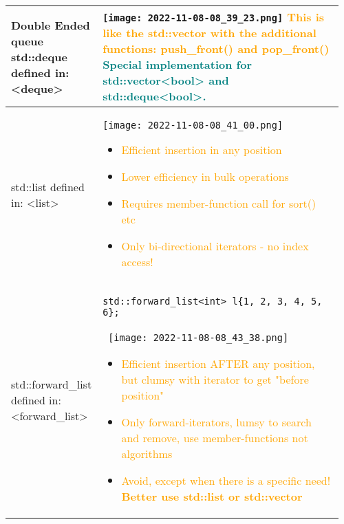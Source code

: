 \documentclass[main.tex,fontsize=8pt,paper=a4,paper=portrait,DIV=calc,]{scrartcl}
\begin{document}
\pagebreak
\begin{table}[ht!]
\begin{tabular}{|m{0.2\linewidth}|m{0.755\linewidth}|}
\hline
Double Ended queue std::deque \newline 
defined in: <deque>& 
\vspace{2mm}
\texttt{[image: 2022-11-08-08\_39\_23.png]}\newline
\textcolor{orange}{This is like the std::vector with the additional functions: \textbf{push\_front() and pop\_front()}}\newline
\textcolor{teal}{Special implementation for std::vector<bool> and std::deque<bool>.}\\
\hline
std::list \newline 
defined in: <list> & 
\vspace{2mm}
\texttt{[image: 2022-11-08-08\_41\_00.png]}\newline
\begin{itemize}
\item \textcolor{orange}{Efficient insertion in any position}
\item \textcolor{orange}{Lower efficiency in bulk operations}
\item \textcolor{orange}{Requires member-function call for sort() etc}
\item \textcolor{orange}{Only bi-directional iterators - no index access!}
\vspace{-2mm}
\end{itemize}\\
\hline
std::forward\_list \newline 
defined in: <forward\_list> & 
\begin{lstlisting}
std::forward_list<int> l{1, 2, 3, 4, 5, 6};
\end{lstlisting}
\, \newline
\texttt{[image: 2022-11-08-08\_43\_38.png]}\newline
\begin{itemize}
\item \textcolor{orange}{Efficient insertion AFTER any position, but clumsy with iterator to get "before position"}
\item \textcolor{orange}{Only forward-iterators, lumsy to search and remove, use member-functions not algorithms}
\item \textcolor{orange}{Avoid, except when there is a specific need! \textbf{Better use std::list or std::vector}}
\vspace{-2mm}
\end{itemize}\\

\end{tabular}
\end{table}
\end{document}
